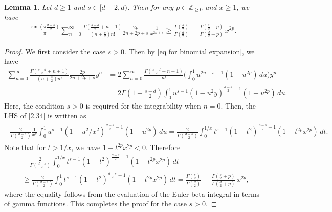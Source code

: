 \documentclass[10pt,a4paper]{amsart}
\newtheorem{lem}{Lemma}
\begin{document}
\begin{lem}\label{Lem_hypergeometric inequal for power type potential}
Let $d \ge 1$ and $s \in [d-2,d)$. Then for any $p\in \mathbb{Z}_{ \ge 0 }$ and $x \ge 1$, we have 
\begin{align} \label{2.34}
 \frac{\sin(\pi\tfrac{d-s}{2})}{\pi} \sum_{n=0}^\infty \frac{  \Gamma( \frac{s-d}{2}+n+1 )  }{  (n+\frac{s}{2}) n! }   \frac{2p}{2n+2p+s}    \, \frac{1}{x^{2n+s}}  \ge     \frac{ \Gamma(\frac{s}{2})   }{ \Gamma(\frac{d}{2})  }  \,  -    \frac{ \Gamma(\frac{s}{2}+p)   }{ \Gamma(\frac{d}{2}+p)  } \,      x^{2p}.
\end{align}
\end{lem}

\begin{proof} 

We first consider the case $s >0$. Then by \eqref{eq for binomial expansion}, we have 
\begin{align*}
 \sum_{n=0}^\infty \frac{  \Gamma( \frac{s-d}{2}+n+1 )  }{  (n+\frac{s}{2}) n! }   \frac{2p}{2n+2p+s} y^{n} &= 2\sum_{n=0}^\infty \frac{  \Gamma( \frac{s-d}{2}+n+1 )  }{    n! }  \bigg(\int_0^1 u^{2n+s-1}(1-u^{2p})\,du \bigg)  y^n
\\
&= 2 \Gamma( 1+\tfrac{s-d}{2} ) \int_0^1 u^{s-1} (1-u^2y)^{ \frac{d-s}{2}-1 } (1-u^{2p})\,du .
\end{align*}
Here, the condition $s>0$ is required for the integrability when $n=0$.
Then, the LHS of \eqref{2.34} is written as 
\begin{align}
\begin{split}
 \frac{2}{ \Gamma( \frac{d-s}{2} ) } \frac{1}{x^s} \int_0^1 u^{s-1} (1-u^2/x^2)^{ \frac{d-s}{2}-1 } (1-u^{2p})\,du
= \frac{2}{ \Gamma( \frac{d-s}{2} ) }   \int_0^{1/x} t^{s-1} (1-t^2)^{ \frac{d-s}{2}-1 } (1-t^{2p}x^{2p})\,dt. 
\end{split}  
\end{align}
Note that for $t>1/x$, we have $1-t^{2p}x^{2p}<0$. Therefore 
\begin{align*}
&\quad \frac{2}{ \Gamma( \frac{d-s}{2} ) }   \int_0^{1/x} t^{s-1} (1-t^2)^{ \frac{d-s}{2}-1 } (1-t^{2p}x^{2p})\,dt 
\\
& \ge \frac{2}{ \Gamma( \frac{d-s}{2} ) }   \int_0^{1} t^{s-1} (1-t^2)^{ \frac{d-s}{2}-1 } (1-t^{2p}x^{2p})\,dt =   \frac{ \Gamma(\frac{s}{2})   }{ \Gamma(\frac{d}{2})  }  \,  -    \frac{ \Gamma(\frac{s}{2}+p)   }{ \Gamma(\frac{d}{2}+p)  } \,      x^{2p},
\end{align*}
where the equality follows from the evaluation of the Euler beta integral in terms of gamma functions.
This completes the proof for the case $s>0$. 


\end{proof}
\end{document}
